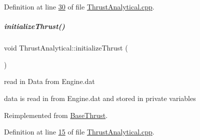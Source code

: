 Definition at line \hyperlink{_thrust_analytical_8cpp_source_l00030}{30} of file \hyperlink{_thrust_analytical_8cpp_source}{Thrust\+Analytical.\+cpp}.

\mbox{\label{group___engine_a5c1db29b00aa92e9f22806b0ea482e05}} 
\subparagraph{\texorpdfstring{initialize\+Thrust()}{initializeThrust()}}
{\footnotesize\ttfamily void Thrust\+Analytical\+::initialize\+Thrust (\begin{DoxyParamCaption}{ }\end{DoxyParamCaption})\hspace{0.3cm}{\ttfamily [virtual]}}



read in Data from Engine.\+dat 

data is read in from Engine.\+dat and stored in private variables 

Reimplemented from \hyperlink{group___engine}{Base\+Thrust}.



Definition at line \hyperlink{_thrust_analytical_8cpp_source_l00015}{15} of file \hyperlink{_thrust_analytical_8cpp_source}{Thrust\+Analytical.\+cpp}.

